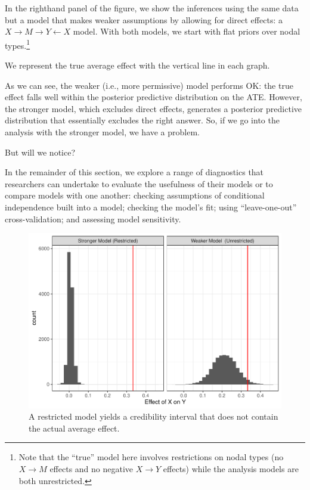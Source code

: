 \documentclass[
  12pt,
]{book}
\begin{document}
In the righthand panel of the figure, we show the inferences using the same data but a model that makes weaker assumptions by allowing for direct effects: a \(X \rightarrow M \rightarrow Y \leftarrow X\) model. With both models, we start with flat priors over nodal types.\footnote{Note that the ``true'' model here involves restrictions on nodal types (no \(X \rightarrow M\) effects and no negative \(X \rightarrow Y\) effects) while the analysis models are both unrestricted.}

We represent the true average effect with the vertical line in each graph.

As we can see, the weaker (i.e., more permissive) model performs OK: the true effect falls well within the posterior predictive distribution on the ATE. However, the stronger model, which excludes direct effects, generates a posterior predictive distribution that essentially excludes the right answer. So, if we go into the analysis with the stronger model, we have a problem.

But will we notice?

In the remainder of this section, we explore a range of diagnostics that researchers can undertake to evaluate the usefulness of their models or to compare models with one another: checking assumptions of conditional independence built into a model; checking the model's fit; using ``leave-one-out'' cross-validation; and assessing model sensitivity.

\begin{figure}

{\centering \includegraphics{ii_files/figure-latex/badmodels15-1} 

}

\caption{A restricted model yields a credibility interval that does not contain the actual average effect.}\label{fig:badmodels15}
\end{figure}
\end{document}
